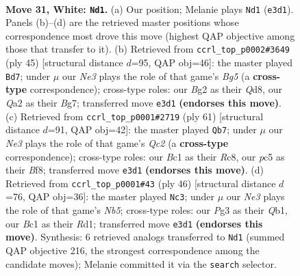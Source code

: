 \documentclass[11pt]{article}
\begin{document}
\clearpage

\begin{figure}[p]\centering
\begin{subfigure}{0.46\textwidth}\centering
\resizebox{\linewidth}{!}{%
\newchessgame
\chessboard[
  setfen={1r1q2k1/p1n1brn1/b6p/P1p2p2/3p1Pp1/1P2N1P1/QR1RP1BP/2B1N1K1 w - - 0 31},
  showmover=false,
  pgfstyle=straightmove, color=movearrow, markmove={e3-d1}
]}
\caption{}
\end{subfigure}\hfill
\begin{subfigure}{0.46\textwidth}\centering
\resizebox{\linewidth}{!}{%
\newchessgame
\chessboard[
  setfen={r2q1rk1/1n3pbp/1p4p1/1NpPp3/P3P1b1/3P2PP/2Q2RB1/1RB3K1 b - - 0 23},
  showmover=false,
  pgfstyle=straightmove, color=movearrow, markmove={g4-d7}
]}
\caption{}
\end{subfigure}
\\[4pt]
\begin{subfigure}{0.46\textwidth}\centering
\resizebox{\linewidth}{!}{%
\newchessgame
\chessboard[
  setfen={2rr1bk1/2q2pp1/1pb1pn1p/p7/P2PP3/3B1N1P/R2B1PP1/3QR1K1 b - - 0 31},
  showmover=false,
  pgfstyle=straightmove, color=movearrow, markmove={c7-b7}
]}
\caption{}
\end{subfigure}\hfill
\begin{subfigure}{0.46\textwidth}\centering
\resizebox{\linewidth}{!}{%
\newchessgame
\chessboard[
  setfen={r2qr1k1/1ppbnp2/7p/1NbP1p2/P3pP1N/4P2P/2BP2P1/1Q1R1RK1 w - - 0 24},
  showmover=false,
  pgfstyle=straightmove, color=movearrow, markmove={b5-c3}
]}
\caption{}
\end{subfigure}
\caption{\textbf{Move 31, White: \texttt{Nd1}.} (a) Our position; Melanie plays \texttt{Nd1} (\texttt{e3d1}). Panels (b)--(d) are the retrieved master positions whose correspondence most drove this move (highest QAP objective among those that transfer to it). (b) Retrieved from \texttt{ccrl\_top\_p0002\#3649} (ply 45) [structural distance $d$=95, QAP obj=46]: the master played \texttt{Bd7}; under $\mu$ our \emph{Ne3} plays the role of that game's \emph{Bg5} (a \textbf{cross-type} correspondence); cross-type roles: our \emph{B}g2 as their \emph{Q}d8, our \emph{Q}a2 as their \emph{B}g7; transferred move \texttt{e3d1} \textbf{(endorses this move)}. (c) Retrieved from \texttt{ccrl\_top\_p0001\#2719} (ply 61) [structural distance $d$=91, QAP obj=42]: the master played \texttt{Qb7}; under $\mu$ our \emph{Ne3} plays the role of that game's \emph{Qc2} (a \textbf{cross-type} correspondence); cross-type roles: our \emph{B}c1 as their \emph{R}c8, our \emph{p}c5 as their \emph{B}f8; transferred move \texttt{e3d1} \textbf{(endorses this move)}. (d) Retrieved from \texttt{ccrl\_top\_p0001\#43} (ply 46) [structural distance $d$=76, QAP obj=36]: the master played \texttt{Nc3}; under $\mu$ our \emph{Ne3} plays the role of that game's \emph{Nb5}; cross-type roles: our \emph{P}g3 as their \emph{Q}b1, our \emph{B}c1 as their \emph{R}d1; transferred move \texttt{e3d1} \textbf{(endorses this move)}. Synthesis: 6 retrieved analogs transferred to \texttt{Nd1} (summed QAP objective 216, the strongest correspondence among the candidate moves); Melanie committed it via the \texttt{search} selector.}
\label{fig:thought-m60}
\end{figure}
\end{document}
